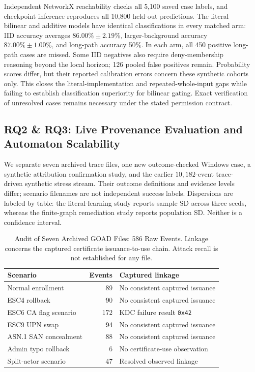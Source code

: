

Independent NetworkX reachability checks all 5,100 saved case labels, and checkpoint inference reproduces all 10,800 held-out predictions. The literal bilinear and additive models have identical classifications in every matched arm: IID accuracy averages $86.00\%\pm2.19\%$, larger-background accuracy $87.00\%\pm1.00\%$, and long-path accuracy 50\%. In each arm, all 450 positive long-path cases are missed. Some IID negatives also require deny-membership reasoning beyond the local horizon; 126 pooled false positives remain. Probability scores differ, but their reported calibration errors concern these synthetic cohorts only. This closes the literal-implementation and repeated-whole-input gaps while failing to establish classification superiority for bilinear gating. Exact verification of unresolved cases remains necessary under the stated permission contract.

\subsection{RQ2 \& RQ3: Live Provenance Evaluation and Automaton Scalability}
We separate seven archived trace files, one new outcome-checked Windows case, a synthetic attribution confirmation study, and the earlier $10,182$-event trace-driven synthetic stress stream. Their outcome definitions and evidence levels differ; scenario filenames are not independent success labels. Dispersions are labeled by table: the literal-learning study reports sample SD across three seeds, whereas the finite-graph remediation study reports population SD. Neither is a confidence interval.

\begin{table}[tbp]
\centering
\caption{Audit of Seven Archived GOAD Files: 586 Raw Events. Linkage concerns the captured certificate issuance-to-use chain. Attack recall is not established for any file.}
\label{tab:live_traces}
\evidencetable
\setlength{\tabcolsep}{2pt}
\begin{tabular}{@{}>{\raggedright\arraybackslash}p{.32\linewidth}r>{\raggedright\arraybackslash}p{.51\linewidth}@{}}
\toprule
Scenario & Events & Captured linkage \\
\midrule
Normal enrollment & 89 & No consistent captured issuance \\
ESC4 rollback & 90 & No consistent captured issuance \\
ESC6 CA flag scenario & 172 & KDC failure result \texttt{0x42} \\
ESC9 UPN swap & 94 & No consistent captured issuance \\
ASN.1 SAN concealment & 88 & No consistent captured issuance \\
Admin typo rollback & 6 & No certificate-use observation \\
Split-actor scenario & 47 & Resolved observed linkage \\
\bottomrule
\end{tabular}
\end{table}

